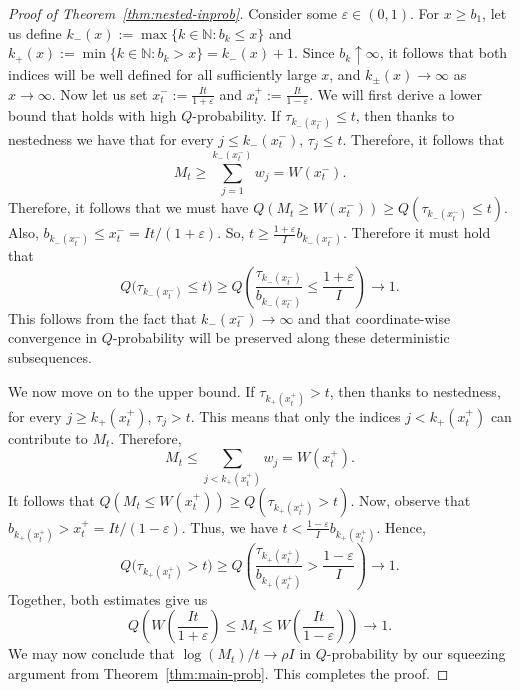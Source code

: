 \documentclass{article}
\newcommand{\NN}{\mathbb N}
\theoremstyle{definition}
\begin{document}
\begin{proof}[Proof of Theorem~\ref{thm:nested-inprob}]
Consider some $\varepsilon\in(0,1)$. For $x\ge b_1$, let us define $k_{-}(x):=\max\{k\in\mathbb N: b_k\le x\}$ and $k_+(x):=\min\{k\in\NN : b_k>x\}=k_-(x)+1$. Since $b_k\uparrow\infty$, it follows that both indices will be well defined for all sufficiently large $x$, and $k_{\pm}(x)\to\infty$ as $x\to\infty$. Now let us set $x_t^{-}:=\frac{It}{1+\varepsilon}$ and $x_t^{+}:=\frac{It}{1-\varepsilon}$. We will first derive a lower bound that holds with high $Q$-probability. If $\tau_{k_{-}(x_t^{-})}\le t$, then thanks to nestedness we have that for every $j\le k_{-}(x_t^{-})$, $\tau_j\le t$. Therefore, it follows that
\[
M_t\ge \sum_{j=1}^{k_-(x_t^-)} w_j=W(x_t^-).
\]
Therefore, it follows that we must have $Q(M_t\ge W(x_t^{-}))\ge Q(\tau_{k_{-}(x_t^{-})}\le t)$. Also, $b_{k_{-}(x_t^{-})}\le x_t^{-}=It/(1+\varepsilon)$. So, $t\ge \frac{1+\varepsilon}{I}b_{k_{-}(x_t^{-})}$. Therefore it must hold that
\[
Q\bigl(\tau_{k_-(x_t^-)} \le t\bigr) \ge Q\left( \frac{\tau_{k_-(x_t^-)}}{b_{k_-(x_t^-)}} \le \frac{1+\varepsilon}{I} \right) \longrightarrow 1.
\]
This follows from the fact that $k_{-}(x_t^{-})\to\infty$ and that coordinate-wise convergence in $Q$-probability will be preserved along these deterministic subsequences. 

We now move on to the upper bound. If $\tau_{k_{+}(x_t^{+})}>t$, then thanks to nestedness, for every $j\ge k_{+}(x_t^{+})$, $\tau_j>t$. This means that only the indices $j<k_{+}(x_t^{+})$ can contribute to $M_t$. Therefore,
\[
M_t\le \sum_{j<k_{+}(x_t^{+})} w_j = W(x_t^{+}).
\]
It follows that $Q(M_t\le W(x_t^{+}))\ge Q(\tau_{k_{+}(x_t^{+})}>t)$. Now, observe that $b_{k_{+}(x_t^{+})}>x_t^{+}=It/(1-\varepsilon)$. Thus, we have $t<\frac{1-\varepsilon}{I}b_{k_{+}(x_t^{+})}$. Hence,
\[
Q\bigl(\tau_{k_+(x_t^+)} > t\bigr) \ge Q\left( \frac{\tau_{k_+(x_t^+)}}{b_{k_+(x_t^+)}} > \frac{1-\varepsilon}{I} \right) \longrightarrow 1.
\]
Together, both estimates give us
\[
Q\left( W\left(\frac{It}{1+\varepsilon}\right) \le M_t \le W\left(\frac{It}{1-\varepsilon}\right) \right) \longrightarrow 1.
\]
We may now conclude that $\log(M_t)/t \to \rho I$ in $Q$-probability by our squeezing argument from Theorem~\ref{thm:main-prob}. This completes the proof.
\end{proof}
\end{document}
